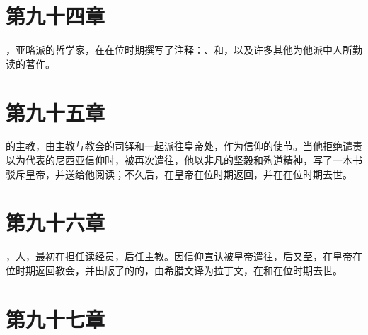 
\section{第九十四章}

，亚略派的哲学家，在在位时期撰写了注释：、和，以及许多其他为他派中人所勤读的著作。\par


\section{第九十五章}

的主教，由主教与教会的司铎和一起派往皇帝处，作为信仰的使节。当他拒绝谴责以为代表的尼西亚信仰时，被再次遣往，他以非凡的坚毅和殉道精神，写了一本书驳斥皇帝，并送给他阅读；不久后，在皇帝在位时期返回，并在在位时期去世。\par


\section{第九十六章}

，人，最初在担任读经员，后任主教。因信仰宣认被皇帝遣往，后又至，在皇帝在位时期返回教会，并出版了的的，由希腊文译为拉丁文，在和在位时期去世。\par


\section{第九十七章}

